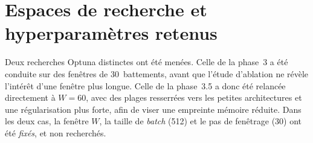 
\chapter{Espaces de recherche et hyperparamètres retenus}
\label{ann:hyperparams}

Deux recherches Optuna distinctes ont été menées. Celle de la phase~3 a été
conduite sur des fenêtres de 30~battements, avant que l'étude d'ablation ne
révèle l'intérêt d'une fenêtre plus longue. Celle de la phase~3.5 a donc été
relancée directement à \(W = 60\), avec des plages resserrées vers les petites
architectures et une régularisation plus forte, afin de viser une empreinte
mémoire réduite. Dans les deux cas, la fenêtre \(W\), la taille de \textit{batch}
(512) et le pas de fenêtrage (30) ont été \emph{fixés}, et non recherchés.

